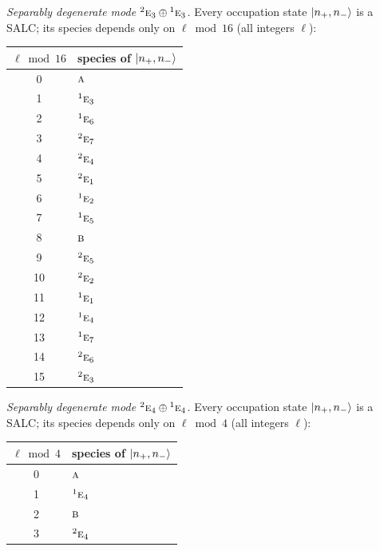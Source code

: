\documentclass[11pt]{article}
\newcommand{\irr}[1]{\text{\normalfont\scshape #1}}
\newcommand{\conjpair}[1]{{}^{#1}}
\begin{document}
\emph{Separably degenerate mode $\conjpair{2}\irr{e}_{3}\oplus \conjpair{1}\irr{e}_{3}$.} Every occupation state $\ket{n_+,n_-}$ is a SALC; its species depends only on $\ell\bmod 16$ (all integers $\ell$):
\begin{longtable}{c l}\hline $\ell\bmod 16$ & species of $\ket{n_+,n_-}$\\ \hline\endhead
0 & $\irr{a}$\\
1 & $\conjpair{1}\irr{e}_{3}$\\
2 & $\conjpair{1}\irr{e}_{6}$\\
3 & $\conjpair{2}\irr{e}_{7}$\\
4 & $\conjpair{2}\irr{e}_{4}$\\
5 & $\conjpair{2}\irr{e}_{1}$\\
6 & $\conjpair{1}\irr{e}_{2}$\\
7 & $\conjpair{1}\irr{e}_{5}$\\
8 & $\irr{b}$\\
9 & $\conjpair{2}\irr{e}_{5}$\\
10 & $\conjpair{2}\irr{e}_{2}$\\
11 & $\conjpair{1}\irr{e}_{1}$\\
12 & $\conjpair{1}\irr{e}_{4}$\\
13 & $\conjpair{1}\irr{e}_{7}$\\
14 & $\conjpair{2}\irr{e}_{6}$\\
15 & $\conjpair{2}\irr{e}_{3}$\\
\hline\end{longtable}

\emph{Separably degenerate mode $\conjpair{2}\irr{e}_{4}\oplus \conjpair{1}\irr{e}_{4}$.} Every occupation state $\ket{n_+,n_-}$ is a SALC; its species depends only on $\ell\bmod 4$ (all integers $\ell$):
\begin{longtable}{c l}\hline $\ell\bmod 4$ & species of $\ket{n_+,n_-}$\\ \hline\endhead
0 & $\irr{a}$\\
1 & $\conjpair{1}\irr{e}_{4}$\\
2 & $\irr{b}$\\
3 & $\conjpair{2}\irr{e}_{4}$\\
\hline\end{longtable}
\end{document}
